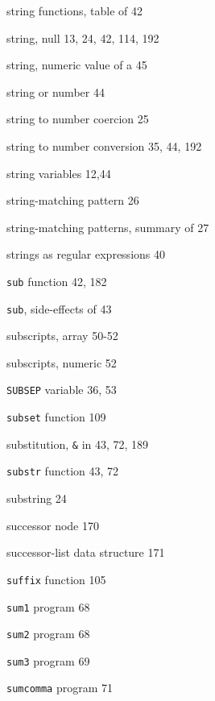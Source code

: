 \begin{multicols}{3}
\hangindent=4pc  string functions, table of 42

\hangindent=4pc  string, null 13, 24, 42, 114, 192

\hangindent=4pc  string, numeric value of a 45

\hangindent=4pc  string or number 44

\hangindent=4pc  string to number coercion 25

\hangindent=4pc  string to number conversion 35, 44, 192

\hangindent=4pc  string variables 12,44

\hangindent=4pc  string-matching pattern 26

\hangindent=4pc  string-matching patterns, summary of 27

\hangindent=4pc  strings as regular expressions 40

\hangindent=4pc  \verb'sub' function 42, 182

\hangindent=4pc  \verb'sub', side-effects of 43

\hangindent=4pc  subscripts, array 50-52

\hangindent=4pc  subscripts, numeric 52

\hangindent=4pc  \verb'SUBSEP' variable 36, 53

\hangindent=4pc  \verb'subset' function 109

\hangindent=4pc  substitution, \verb'&' in 43, 72, 189

\hangindent=4pc  \verb'substr' function 43, 72

\hangindent=4pc  substring 24

\hangindent=4pc  successor node 170

\hangindent=4pc  successor-list data structure 171

\hangindent=4pc  \verb'suffix' function 105







\hangindent=4pc  \verb'sum1' program 68

\hangindent=4pc  \verb'sum2' program 68

\hangindent=4pc  \verb'sum3' program 69

\hangindent=4pc  \verb'sumcomma' program 71


\end{multicols}
